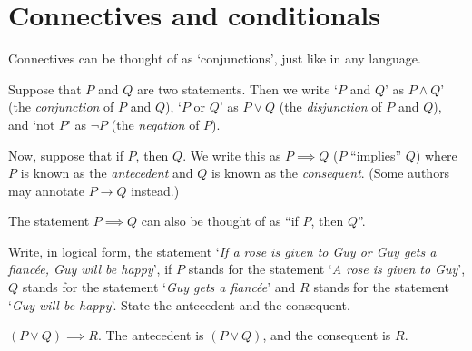 \section{Connectives and conditionals}
Connectives can be thought of as `conjunctions', just like in any language.

Suppose that $P$ and $Q$ are two statements.
Then we write `$P$ and $Q$' as $P \land Q$' (the \textit{conjunction} of $P$ and $Q$), `$P$ or $Q$'
as $P \lor Q$ (the \textit{disjunction} of $P$ and $Q$), and `not $P$' as $\lnot P$ (the \textit{negation}
of $P$).

Now, suppose that if $P$, then $Q$. We write this as $P \implies Q$ ($P$ ``implies'' $Q$) where
$P$ is known as the \textit{antecedent} and $Q$ is known as the \textit{consequent}. (Some authors may annotate
$P \rightarrow Q$ instead.)

The statement $P \implies Q$ can also be thought of as ``if $P$, then $Q$''.

\begin{example}
    Write, in logical form, the statement `\textit{If a rose is given to Guy or Guy gets a fianc\'{e}e, Guy will be happy}',
    if $P$ stands for the statement `\textit{A rose is given to Guy}',
    $Q$ stands for the statement `\textit{Guy gets a fianc\'{e}e}' and
    $R$ stands for the statement `\textit{Guy will be happy}'. State the antecedent and the consequent.
\end{example}
\begin{solution}
    $(P \lor Q) \implies R$. The antecedent is $(P \lor Q)$, and the
    consequent is $R$.
\end{solution}